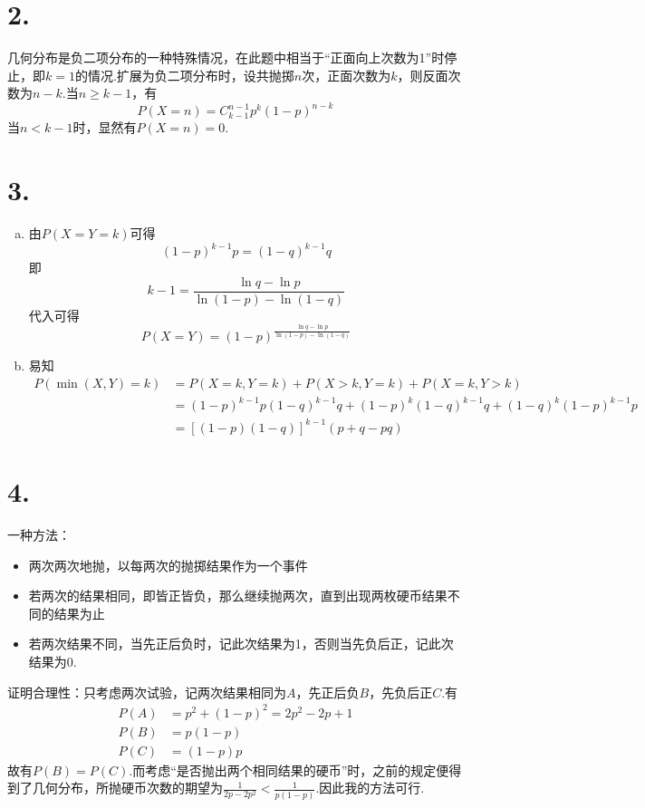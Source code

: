 \documentclass[twocolumn]{article}
\begin{document}
\begin{CJK}{UTF8}{gbsn}
			\section*{2.}
				几何分布是负二项分布的一种特殊情况，在此题中相当于``正面向上次数为1''时停止，即$k=1$的情况.扩展为负二项分布时，设共抛掷$n$次，正面次数为$k$，则反面次数为$n-k$.当$n\ge k-1$，有\[P(X=n)=C_{k-1}^{n-1}p^k(1-p)^{n-k}\]当$n<k-1$时，显然有$P(X=n)=0$.
			\section*{3.}
				\begin{enumerate}[a)]
					\item 由$P(X=Y=k)$可得\[(1-p)^{k-1}p=(1-q)^{k-1}q\]即\[k-1=\frac{\ln q-\ln p}{\ln(1-p)-\ln(1-q)}\]代入可得\[P(X=Y)=(1-p)^{\frac{\ln q-\ln p}{\ln(1-p)-\ln(1-q)}}\]
					\item 易知\begin{align*}
						P(\min(X,Y)=k) & = P(X=k,Y=k)+P(X>k,Y=k)+P(X=k,Y>k) \\
						& = (1-p)^{k-1}p(1-q)^{k-1}q+(1-p)^k(1-q)^{k-1}q+(1-q)^k(1-p)^{k-1}p \\
						& = [(1-p)(1-q)]^{k-1}(p+q-pq)
					\end{align*}
				\end{enumerate}
			\section*{4.}
				一种方法：\begin{itemize}
					\item 两次两次地抛，以每两次的抛掷结果作为一个事件
					\item 若两次的结果相同，即皆正皆负，那么继续抛两次，直到出现两枚硬币结果不同的结果为止
					\item 若两次结果不同，当先正后负时，记此次结果为1，否则当先负后正，记此次结果为0.
				\end{itemize}
				证明合理性：只考虑两次试验，记两次结果相同为$A$，先正后负$B$，先负后正$C$.有\begin{align*}
					P(A) & = p^2+(1-p)^2 = 2p^2-2p+1\\
					P(B) & = p(1-p) \\
					P(C) & = (1-p)p
				\end{align*}
				故有$P(B)=P(C)$.而考虑``是否抛出两个相同结果的硬币''时，之前的规定便得到了几何分布，所抛硬币次数的期望为$\frac{1}{2p-2p^2}<\frac{1}{p(1-p)}$.因此我的方法可行.
	\end{CJK}
\end{document}
